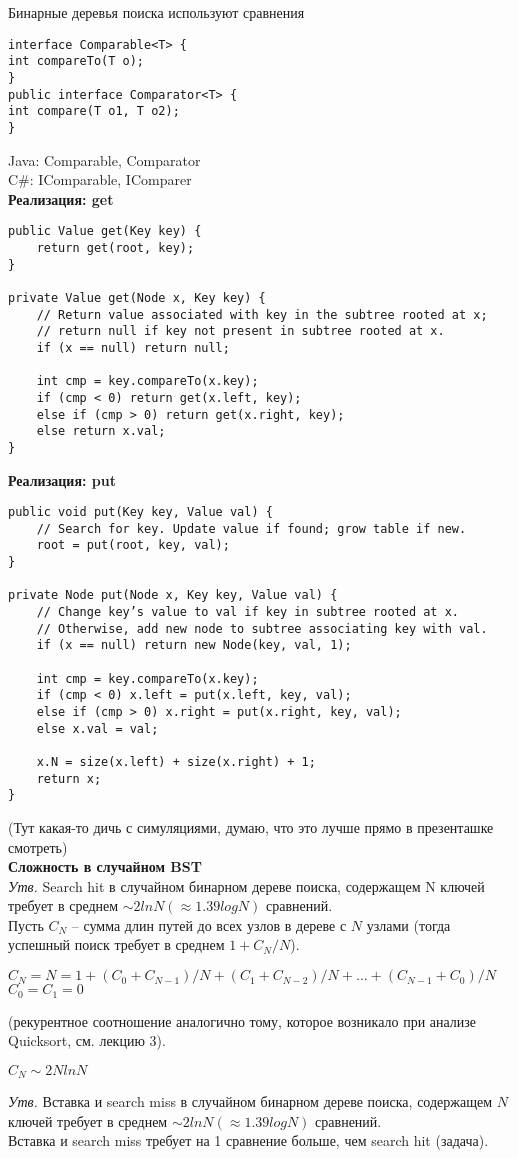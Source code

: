 Бинарные деревья поиска используют сравнения
\begin{verbatim}
interface Comparable<T> {
int compareTo(T o);
}
public interface Comparator<T> {
int compare(T o1, T o2);
}
\end{verbatim}
\noindent Java: Comparable, Comparator \\
C\#: IComparable, IComparer\\
{\bf Реализация: get}
\begin{verbatim}
public Value get(Key key) {
    return get(root, key);
}

private Value get(Node x, Key key) {
    // Return value associated with key in the subtree rooted at x;
    // return null if key not present in subtree rooted at x.
    if (x == null) return null;
    
    int cmp = key.compareTo(x.key);
    if (cmp < 0) return get(x.left, key);
    else if (cmp > 0) return get(x.right, key);
    else return x.val;
}
\end{verbatim}
{\bf Реализация: put}
\begin{verbatim}
public void put(Key key, Value val) {
    // Search for key. Update value if found; grow table if new.
    root = put(root, key, val);
}

private Node put(Node x, Key key, Value val) {
    // Change key’s value to val if key in subtree rooted at x.
    // Otherwise, add new node to subtree associating key with val.
    if (x == null) return new Node(key, val, 1);
    
    int cmp = key.compareTo(x.key);
    if (cmp < 0) x.left = put(x.left, key, val);
    else if (cmp > 0) x.right = put(x.right, key, val);
    else x.val = val;
    
    x.N = size(x.left) + size(x.right) + 1;
    return x;
}
\end{verbatim}
(Тут какая-то дичь с симуляциями, думаю, что это лучше прямо в презенташке смотреть)\\
{\bf Сложность в случайном BST}\\
\textit{Утв.} Search hit в случайном бинарном дереве поиска,
содержащем N ключей требует в среднем $\sim 2 ln N (\approx 1.39 log N)$ сравнений.\\
Пусть $C_N$ – сумма длин путей до всех узлов в дереве с $N$ узлами (тогда успешный поиск требует в среднем $1 + C_N /N$).
\begin{center}
$C_N = N=1+(C_0+C_{N-1})/N+(C_1+C_{N-2})/N+. . .+(C_{N-1}+C_0)/N$\\
$C_0 = C_1 = 0$
\end{center}
(рекурентное соотношение аналогично тому, которое возникало при анализе Quicksort, см. лекцию 3).
\vspace{2mm}
\begin{center}
$C_N \sim 2N ln N$
\end{center}
\vspace{3mm}
\textit{Утв.} Вставка и search miss в случайном бинарном дереве
поиска, содержащем $N$ ключей требует в среднем $\sim 2 ln N (\approx 1.39 log N)$ сравнений.\\
Вставка и search miss требует на 1 сравнение больше, чем
search hit (задача).

